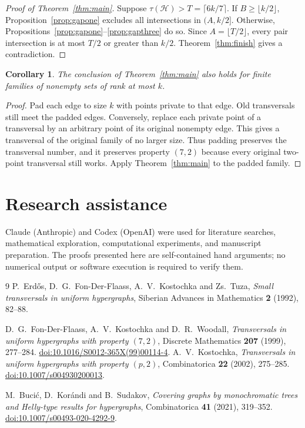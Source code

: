 \documentclass[11pt]{article}
\numberwithin{equation}{section}
\newtheorem{corollary}[theorem]{Corollary}
\theoremstyle{definition}
\theoremstyle{remark}
\newcommand{\HH}{\mathcal H}
\begin{document}
\begin{proof}[Proof of Theorem~\ref{thm:main}]
Suppose $\tau(\HH)>T=\lceil6k/7\rceil$.
If $B\ge\lfloor k/2\rfloor$, Proposition~\ref{prop:gapone} excludes
all intersections in $(A,k/2]$.
Otherwise, Propositions~\ref{prop:gapone}--\ref{prop:gapthree} do so.
Since $A=\lfloor T/2\rfloor$, every pair intersection is at most
$T/2$ or greater than $k/2$. Theorem~\ref{thm:finish} gives a
contradiction.
\end{proof}

\begin{corollary}
The conclusion of Theorem~\ref{thm:main} also holds for finite families
of nonempty sets of rank at most $k$.
\end{corollary}
\begin{proof}
Pad each edge to size $k$ with points private to that edge. Old
transversals still meet the padded edges. Conversely, replace each
private point of a transversal by an arbitrary point of its original
nonempty edge. This gives a transversal of the original family of no
larger size. Thus padding preserves the transversal number, and it
preserves property $(7,2)$ because every original two-point transversal
still works. Apply Theorem~\ref{thm:main} to the padded family.
\end{proof}

\appendix




\section*{Research assistance}
Claude (Anthropic) and Codex (OpenAI) were used for literature searches,
mathematical exploration, computational experiments, and manuscript
preparation. The proofs presented here are self-contained hand arguments;
no numerical output or software execution is required to verify them.

\begin{thebibliography}{9}
P.~Erd\H{o}s, D.~G.~Fon-Der-Flaass, A.~V.~Kostochka and Zs.~Tuza,
\emph{Small transversals in uniform hypergraphs},
Siberian Advances in Mathematics \textbf{2} (1992), 82--88.

D.~G.~Fon-Der-Flaass, A.~V.~Kostochka and D.~R.~Woodall,
\emph{Transversals in uniform hypergraphs with property $(7,2)$},
Discrete Mathematics \textbf{207} (1999), 277--284.
\href{https://doi.org/10.1016/S0012-365X(99)00114-4}
{doi:10.1016/S0012-365X(99)00114-4}.
A.~V.~Kostochka,
\emph{Transversals in uniform hypergraphs with property $(p,2)$},
Combinatorica \textbf{22} (2002), 275--285.
\href{https://doi.org/10.1007/s004930200013}{doi:10.1007/s004930200013}.

M.~Buci\'c, D.~Kor\'andi and B.~Sudakov,
\emph{Covering graphs by monochromatic trees and Helly-type results
for hypergraphs}, Combinatorica \textbf{41} (2021), 319--352.
\href{https://doi.org/10.1007/s00493-020-4292-9}
{doi:10.1007/s00493-020-4292-9}.
\end{thebibliography}
\end{document}

